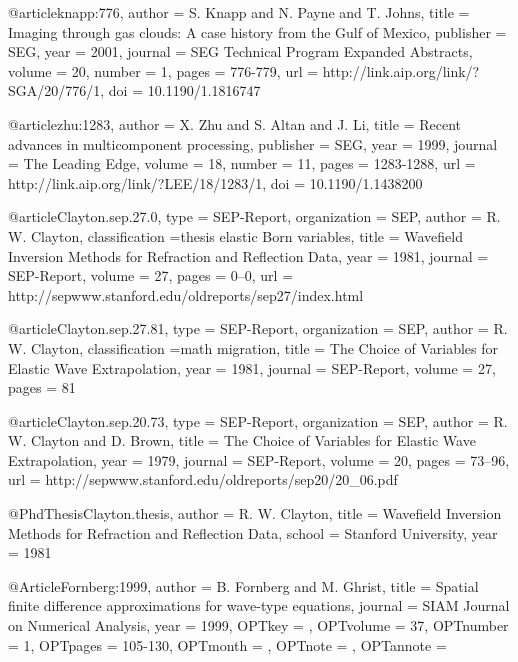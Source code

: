 @article{knapp:776,
  author =	 {S. Knapp and N. Payne and T. Johns},
  title =	 {Imaging through gas clouds: A case history from the
                  Gulf of Mexico},
  publisher =	 {SEG},
  year =	 2001,
  journal =	 {SEG Technical Program Expanded Abstracts},
  volume =	 20,
  number =	 1,
  pages =	 {776-779},
  url =		 {http://link.aip.org/link/?SGA/20/776/1},
  doi =		 {10.1190/1.1816747}
}

@article{zhu:1283,
  author =	 {X. Zhu and S. Altan and J. Li},
  title =	 {Recent advances in multicomponent processing},
  publisher =	 {SEG},
  year =	 1999,
  journal =	 {The Leading Edge},
  volume =	 18,
  number =	 11,
  pages =	 {1283-1288},
  url =		 {http://link.aip.org/link/?LEE/18/1283/1},
  doi =		 {10.1190/1.1438200}
}

@article{Clayton.sep.27.0,
  type =	 {SEP-Report},
  organization = {SEP},
  author =	 {R. W. Clayton},
  classification ={thesis elastic {Born} variables},
  title =	 {Wavefield Inversion Methods for Refraction and
                  Reflection Data},
  year =	 1981,
  journal =	 {SEP-Report},
  volume =	 27,
  pages =	 {0--0},
  url =
                  {http://sepwww.stanford.edu/oldreports/sep27/index.html}
}

@article{Clayton.sep.27.81,
  type =	 {SEP-Report},
  organization = {SEP},
  author =	 {R. W. Clayton},
  classification ={math migration},
  title =	 {The Choice of Variables for Elastic Wave
                  Extrapolation},
  year =	 1981,
  journal =	 {SEP-Report},
  volume =	 27,
  pages =	 81
}

@article{Clayton.sep.20.73,
  type =	 {SEP-Report},
  organization = {SEP},
  author =	 {R. W. Clayton and D. Brown},
  title =	 {The Choice of Variables for Elastic Wave
                  Extrapolation},
  year =	 1979,
  journal =	 {SEP-Report},
  volume =	 20,
  pages =	 {73--96},
  url =
                  {http://sepwww.stanford.edu/oldreports/sep20/20_06.pdf}
}

@PhdThesis{Clayton.thesis,
  author =	 {R. W. Clayton},
  title =	 {Wavefield Inversion Methods for Refraction and
                  Reflection Data},
  school =	 {Stanford University},
  year =	 1981
}

@Article{Fornberg:1999,
  author = 	 {B. Fornberg and M. Ghrist},
  title = 	 {Spatial finite difference approximations for
                  wave-type equations},
  journal = 	 {SIAM Journal on Numerical Analysis},
  year = 	 {1999},
  OPTkey = 	 {},
  OPTvolume = 	 {37},
  OPTnumber = 	 {1},
  OPTpages = 	 {105-130},
  OPTmonth = 	 {},
  OPTnote = 	 {},
  OPTannote = 	 {}
}

